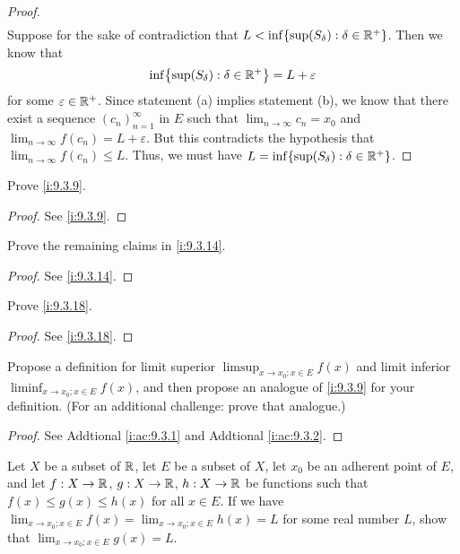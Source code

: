 \begin{proof}
\begin{align*}
  \end{align*}
  Suppose for the sake of contradiction that \(L < \inf\set{\sup(S_\delta) : \delta \in \R^+}\).
  Then we know that
  \[
    \inf\set{\sup(S_\delta) : \delta \in \R^+} = L + \varepsilon
  \]
  for some \(\varepsilon \in \mathbb{R}^+\).
  Since statement (a) implies statement (b), we know that there exist a sequence \((c_n)_{n = 1}^\infty\) in \(E\) such that \(\lim_{n \to \infty} c_n = x_0\) and \(\lim_{n \to \infty} f(c_n) = L + \varepsilon\).
  But this contradicts the hypothesis that \(\lim_{n \to \infty} f(c_n) \leq L\).
  Thus, we must have \(L = \inf\set{\sup(S_{\delta}) : \delta \in \R^+}\).
\end{proof}

\exercisesection

\begin{ex}\label{i:ex:9.3.1}
  Prove \cref{i:9.3.9}.
\end{ex}

\begin{proof}
  See \cref{i:9.3.9}.
\end{proof}

\begin{ex}\label{i:ex:9.3.2}
  Prove the remaining claims in \cref{i:9.3.14}.
\end{ex}

\begin{proof}
  See \cref{i:9.3.14}.
\end{proof}

\begin{ex}\label{i:ex:9.3.3}
  Prove \cref{i:9.3.18}.
\end{ex}

\begin{proof}
  See \cref{i:9.3.18}.
\end{proof}

\begin{ex}\label{i:ex:9.3.4}
  Propose a definition for limit superior \(\limsup_{x \to x_0 ; x \in E} f(x)\) and limit inferior \(\liminf_{x \to x_0 ; x \in E} f(x)\), and then propose an analogue of \cref{i:9.3.9} for your definition.
  (For an additional challenge: prove that analogue.)
\end{ex}

\begin{proof}
  See Addtional \cref{i:ac:9.3.1} and Addtional \cref{i:ac:9.3.2}.
\end{proof}

\begin{ex}\label{i:ex:9.3.5}
  Let \(X\) be a subset of \(\mathbb{R}\), let \(E\) be a subset of \(X\), let \(x_0\) be an adherent point of \(E\), and let \(f : X \to \mathbb{R}\), \(g : X \to \mathbb{R}\), \(h : X \to \mathbb{R}\) be functions such that \(f(x) \leq g(x) \leq h(x)\) for all \(x \in E\).
  If we have \(\lim_{x \to x_0 ; x \in E} f(x) = \lim_{x \to x_0 ; x \in E} h(x) = L\) for some real number \(L\), show that \(\lim_{x \to x_0 ; x \in E} g(x) = L\).
\end{ex}

